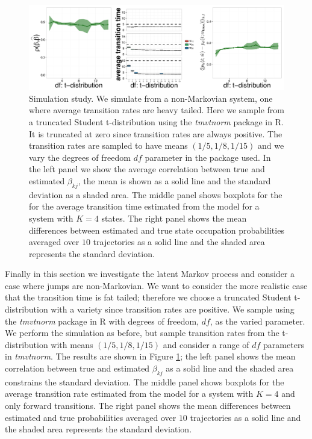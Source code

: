 \begin{figure}
  \centering \includegraphics[width=1\textwidth]{pics/student-t.pdf}
  \caption{Simulation study. We simulate from a non-Markovian system, one where average transition rates are heavy tailed. Here we sample from a truncated Student t-distribution using the \emph{tmvtnorm} package in R. It is truncated at zero since transition rates are always positive. The transition rates are sampled to have means $(1/5, 1/8, 1/15)$ and we vary the degrees of freedom $df$ parameter in the package used. In the left panel we show the average correlation between true and estimated $\beta_{kj}$, the mean is shown as a solid line and the standard deviation as a shaded area. The middle panel shows boxplots for the for the average transition time estimated from the model for a system with $K=4$ states. The right panel shows the mean differences between estimated and true state occupation probabilities averaged over $10$ trajectories as a solid line and the shaded area represents the standard deviation.}
\label{fig:student}
\end{figure}


Finally in this section we investigate the latent Markov process and consider a case where jumps are non-Markovian. We want to consider the more realistic case that the transition time is fat tailed; therefore we choose a truncated Student t-distribution with a variety since transition rates are positive. We sample using the \emph{tmvtnorm} package in R with degrees of freedom, $df$, as the varied parameter. We perform the simulation as before, but sample transition rates from the t-distribution with means $(1/5, 1/8, 1/15)$ and consider a range of $df$ parameters in \emph{tmvtnorm}. The results are shown in Figure \ref{fig:student}; the left panel shows the mean correlation between true and estimated $\beta_{kj}$ as a solid line and the shaded area constrains the standard deviation. The middle panel shows boxplots for the average transition rate estimated from the model for a system with $K=4$ and only forward transitions. The right panel shows the mean differences between estimated and true probabilities averaged over $10$ trajectories as a solid line and the shaded area represents the standard deviation.


